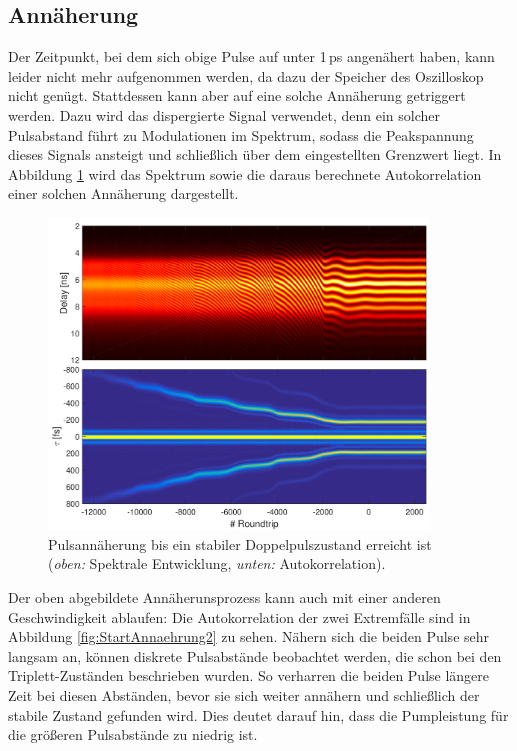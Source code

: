 \documentclass[bachelor,       %
               twoside,        %
               BCOR10mm,       %
               liststotoc,nomtotoc,bibtotoc, %
               english,ngerman, %
               final,          %
               ]{GAUBM}
\begin{document}
\clearpage
\subsection{Annäherung}
Der Zeitpunkt, bei dem sich obige Pulse auf unter 1\,ps angenähert haben, kann leider nicht mehr aufgenommen werden, da dazu der Speicher des Oszilloskop nicht genügt.
Stattdessen kann aber auf eine solche Annäherung getriggert werden.
Dazu wird das dispergierte Signal verwendet, denn ein solcher Pulsabstand führt zu Modulationen im Spektrum, sodass die Peakspannung dieses Signals ansteigt und schließlich über dem eingestellten Grenzwert liegt.
In Abbildung \ref{fig:StartAnnaeherung} wird das Spektrum sowie die daraus berechnete Autokorrelation einer solchen Annäherung dargestellt.
\begin{figure}[!htb]
	\centering
	\includegraphics[width=0.9\textwidth]{figures/4ms_25GSA_400m_MLstart_Doppelpulse2_Annaeherung_280500}
	\caption{Pulsannäherung bis ein stabiler Doppelpulszustand erreicht ist\\
	(\textit{oben:} Spektrale Entwicklung, \textit{unten:} Autokorrelation).}
	\label{fig:StartAnnaeherung}
\end{figure}

Der oben abgebildete Annäherunsprozess kann auch mit einer anderen Geschwindigkeit ablaufen:
Die Autokorrelation der zwei Extremfälle sind in Abbildung \ref{fig:StartAnnaehrung2} zu sehen.
Nähern sich die beiden Pulse sehr langsam an, können diskrete Pulsabstände beobachtet werden, die schon bei den Triplett-Zuständen beschrieben wurden.
So verharren die beiden Pulse längere Zeit bei diesen Abständen, bevor sie sich weiter annähern und schließlich der stabile Zustand gefunden wird.
Dies deutet darauf hin, dass die Pumpleistung für die größeren Pulsabstände zu niedrig ist.
\end{document}
